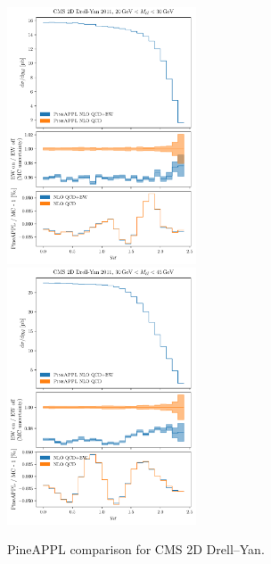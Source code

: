 \begin{figure}
    \centering
    \includegraphics[width=0.5\textwidth]{figures/pineappl_CMSDY2D11_bin1}%
    \includegraphics[width=0.5\textwidth]{figures/pineappl_CMSDY2D11_bin2}
    \caption{PineAPPL comparison for CMS 2D Drell--Yan.}
    \label{fig:cmsdy2d11_bins12}
\end{figure}

